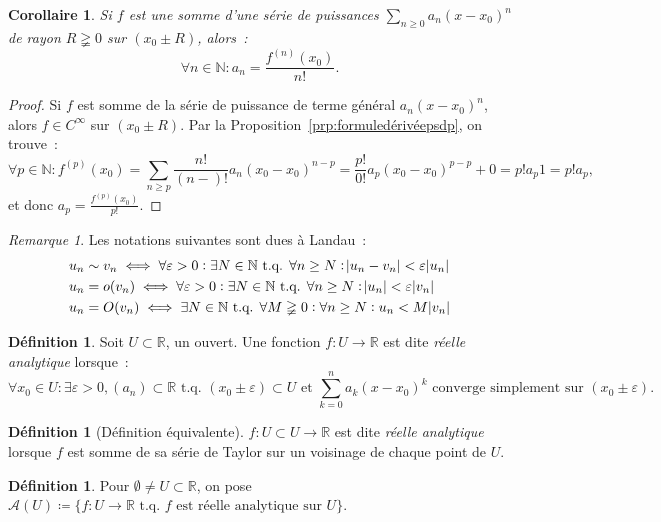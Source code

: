 \documentclass{report}
\newtheorem{cor}[thm]{Corollaire}
\theoremstyle{definition}
\newtheorem{déf}[thm]{Définition}
\theoremstyle{remark}
\newtheorem*{rmq}{Remarque}
\newcommand{\R}{\mathbb R}
\newcommand{\N}{\mathbb N}
\newcommand{\tq}{\text{ t.q. }}
\begin{document}
			\begin{cor} Si $f$ est une somme d'une série de puissances $\sum_{n \geq 0}a_n(x-x_0)^n$ de rayon $R \gneqq 0$ sur $(x_0 \pm R)$, alors~:
			\[\forall n \in \N : a_n = \frac {f^{(n)}(x_0)}{n!}.\]
			\end{cor}

			\begin{proof} Si $f$ est somme de la série de puissance de terme général $a_n(x-x_0)^n$, alors $f \in C^\infty$ sur $(x_0 \pm R)$. Par la
			Proposition~\ref{prp:formuledérivéepsdp}, on trouve~:
			\[\forall p \in \N : f^{(p)}(x_0) = \sum_{n \geq p}\frac {n!}{(n-)!}a_n(x_0-x_0)^{n-p} = \frac {p!}{0!}a_p(x_0-x_0)^{p-p} + 0 = p!a_p1 = p!a_p,\]
			et donc $a_p = \frac {f^{(p)}(x_0)}{p!}$.
			\end{proof}

			\begin{rmq} Les notations suivantes sont dues à Landau~:
			\begin{align*}
				&u_n \sim v_n \iff \forall \varepsilon > 0 : \exists N \in \N \tq \forall n \geq N : \abs {u_n - v_n} < \varepsilon \abs{u_n} \\
				&u_n = o(v_n) \iff \forall \varepsilon > 0 : \exists N \in \N \tq \forall n \geq N : \abs {u_n} < \varepsilon \abs {v_n} \\
				&u_n = O(v_n) \iff \exists N \in \N \tq \forall M \gneqq 0 : \forall n \geq N : u_n < M \abs {v_n}
			\end{align*}
			\end{rmq}

			\begin{déf} Soit $U \subset \R$, un ouvert. Une fonction $f : U \to \R$ est dite \textit{réelle analytique} lorsque~:
			\[\forall x_0 \in U : \exists \varepsilon > 0, (a_n) \subset \R \tq (x_0 \pm \varepsilon) \subset U \text{ et } \sum_{k=0}^na_k(x-x_0)^k
			\text{ converge simplement sur } (x_0 \pm \varepsilon).\]
			\end{déf}

			\begin{déf}[Définition équivalente] $f : U \subset U \to \R$ est dite \textit{réelle analytique} lorsque $f$ est somme de sa série de Taylor sur un
			voisinage de chaque point de $U$.
			\end{déf}

			\begin{déf} Pour $\emptyset \neq U \subset \R$, on pose $\mathcal A(U) \coloneqq \{f : U \to \R \tq f \text{ est réelle analytique sur } U\}$.
			\end{déf}
\end{document}
